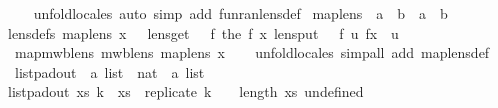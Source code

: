 \begin{isabellebody}
%
\isadelimproof
\ \ %
\endisadelimproof
%
\isatagproof
{}\isamarkupfalse%
\ {\isacharparenleft}unfold{\isacharunderscore}locales{\isacharcomma}\ auto\ simp\ add{\isacharcolon}\ fun{\isacharunderscore}ran{\isacharunderscore}lens{\isacharunderscore}def{\isacharparenright}%
\endisatagproof
{\isafoldproof}%
%
\isadelimproof
%
\endisadelimproof
%
\isamarkuptrue%
\isamarkupfalse%
\ map{\isacharunderscore}lens\ {\isacharcolon}{\isacharcolon}\ {\isachardoublequoteopen}{\isacharprime}a\ {\isasymRightarrow}\ {\isacharparenleft}{\isacharprime}b\ {\isasymLongrightarrow}\ {\isacharparenleft}{\isacharprime}a\ {\isasymrightharpoonup}\ {\isacharprime}b{\isacharparenright}{\isacharparenright}{\isachardoublequoteclose}\ \isanewline
{\isacharbrackleft}lens{\isacharunderscore}defs{\isacharbrackright}{\isacharcolon}\ {\isachardoublequoteopen}map{\isacharunderscore}lens\ x\ {\isacharequal}\ {\isasymlparr}\ lens{\isacharunderscore}get\ {\isacharequal}\ {\isacharparenleft}{\isasymlambda}\ f{\isachardot}\ the\ {\isacharparenleft}f\ x{\isacharparenright}{\isacharparenright}{\isacharcomma}\ lens{\isacharunderscore}put\ {\isacharequal}\ {\isacharparenleft}{\isasymlambda}\ f\ u{\isachardot}\ f{\isacharparenleft}x\ {\isasymmapsto}\ u{\isacharparenright}{\isacharparenright}\ {\isasymrparr}{\isachardoublequoteclose}\isanewline
\isanewline
{}\isamarkupfalse%
\ map{\isacharunderscore}mwb{\isacharunderscore}lens{\isacharcolon}\ {\isachardoublequoteopen}mwb{\isacharunderscore}lens\ {\isacharparenleft}map{\isacharunderscore}lens\ x{\isacharparenright}{\isachardoublequoteclose}\isanewline
%
\isadelimproof
\ \ %
\endisadelimproof
%
\isatagproof
{}\isamarkupfalse%
\ {\isacharparenleft}unfold{\isacharunderscore}locales{\isacharcomma}\ simp{\isacharunderscore}all\ add{\isacharcolon}\ map{\isacharunderscore}lens{\isacharunderscore}def{\isacharparenright}%
\endisatagproof
{\isafoldproof}%
%
\isadelimproof
%
\endisadelimproof
%
\isamarkuptrue%
\isamarkupfalse%
\ list{\isacharunderscore}pad{\isacharunderscore}out\ {\isacharcolon}{\isacharcolon}\ {\isachardoublequoteopen}{\isacharprime}a\ list\ {\isasymRightarrow}\ nat\ {\isasymRightarrow}\ {\isacharprime}a\ list{\isachardoublequoteclose}\ \isanewline
{\isachardoublequoteopen}list{\isacharunderscore}pad{\isacharunderscore}out\ xs\ k\ {\isacharequal}\ xs\ {\isacharat}\ replicate\ {\isacharparenleft}k\ {\isacharplus}\ {}\ {\isacharminus}\ length\ xs{\isacharparenright}\ undefined{\isachardoublequoteclose}\isanewline

\end{isabellebody}
